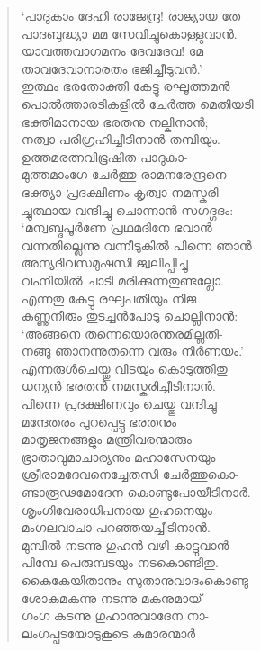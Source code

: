 \begin{verse}
‘പാദുകാം ദേഹി രാജേന്ദ്ര! രാജ്യായ തേ\\
പാദബുദ്ധ്യാ മമ സേവിച്ചുകൊള്ളുവാന്‍.\\
യാവത്തവാഗമനം ദേവദേവ! മേ\\
താവദേവാനാരതം ഭജിച്ചീടുവന്‍.’\\
ഇത്ഥം ഭരതോക്തി കേട്ടു രഘൂത്തമന്‍\\
പൊല്‍ത്താരടികളില്‍ ചേര്‍ത്ത മെതിയടി\\
ഭക്തിമാനായ ഭരതനു നല്കിനാന്‍;\\
നത്വാ പരിഗ്രഹിച്ചീടിനാന്‍ തമ്പിയും.\\
ഉത്തമരത്നവിഭൂഷിത പാദുകാ-\\
മുത്തമാംഗേ ചേര്‍ത്തു രാമനരേന്ദ്രനെ\\
ഭക്ത്യാ പ്രദക്ഷിണം കൃത്വാ നമസ്കരി-\\
ച്ചുത്ഥായ വന്ദിച്ചു ചൊന്നാന്‍ സഗദ്ഗദം:\\
‘മന്വബ്ദപൂര്‍ണേ പ്രഥമദിനേ ഭവാന്‍\\
വന്നതില്ലെന്നു വന്നീടുകില്‍ പിന്നെ ഞാന്‍\\
അന്യദിവസമുഷസി ജ്വലിപ്പിച്ചു\\
വഹ്നിയില്‍ ചാടി മരിക്കുന്നതുണ്ടല്ലോ.\\
എന്നതു കേട്ടു രഘുപതിയും നിജ\\
കണ്ണുനീരും തുടച്ചന്‍പോടു ചൊല്ലിനാന്‍:\\
‘അങ്ങനെ തന്നെയൊരന്തരമില്ലതി-\\
നങ്ങു ഞാനന്നുതന്നെ വരും നിര്‍ണയം.’\\
എന്നരുള്‍ചെയ്തു വിടയും കൊടുത്തിതു\\
ധന്യന്‍ ഭരതന്‍ നമസ്കരിച്ചീടിനാന്‍.\\
പിന്നെ പ്രദക്ഷിണവും ചെയ്തു വന്ദിച്ചു\\
മന്ദേതരം പുറപ്പെട്ടു ഭരതനും\\
മാതൃജനങ്ങളും മന്ത്രിവരന്മാരും\\
ഭ്രാതാവുമാചാര്യനും മഹാസേനയും\\
ശ്രീരാമദേവനെച്ചേതസി ചേര്‍ത്തുകൊ-\\
ണ്ടാരൂഢമോദേന കൊണ്ടുപോയീടിനാര്‍.\\
ശൃംഗിവേരാധിപനായ ഗുഹനെയും\\
മംഗലവാചാ പറഞ്ഞയച്ചീടിനാന്‍.\\
മുമ്പില്‍ നടന്നു ഗുഹന്‍ വഴി കാട്ടുവാന്‍\\
പിമ്പേ പെരുമ്പടയും നടകൊണ്ടിതു.\\
കൈകേയിതാനും സുതാനുവാദംകൊണ്ടു\\
ശോകമകന്നു നടന്നു മകനുമായ്\\
ഗംഗ കടന്നു ഗുഹാനുവാദേന നാ-\\
ലംഗപ്പടയോടുകൂടെ കുമാരന്മാര്‍\\

\end{verse}
